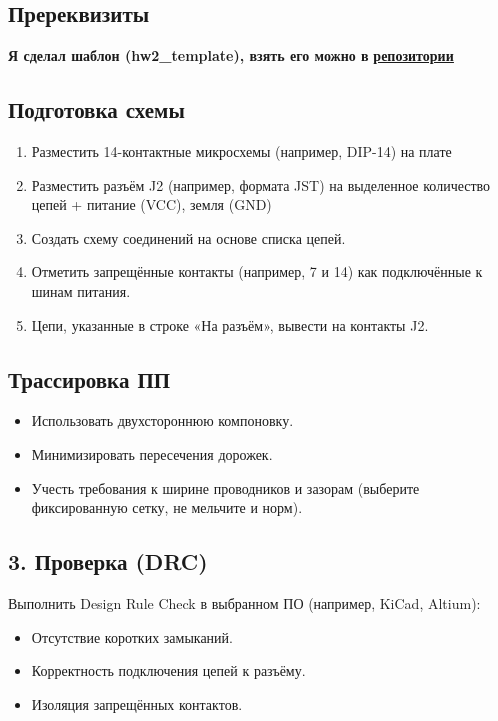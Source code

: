 \documentclass[a4paper, 12pt]{article}
\begin{document}
\subsection{Пререквизиты}
\textbf{Я сделал шаблон (hw2\_template), взять его можно в} \underline{\textbf{\href{https://github.com/Imtjl/ic-pcb-engineering/tree/master/hw2}{репозитории}}}

\subsection{Подготовка схемы}
\begin{enumerate}
	\item Разместить 14-контактные микросхемы (например, DIP-14) на плате
	\item Разместить разъём J2 (например, формата JST) на выделенное количество цепей + питание (VCC), земля (GND)
	\item Создать схему соединений на основе списка цепей.
	\item Отметить запрещённые контакты (например, 7 и 14) как подключённые к шинам питания.
	\item Цепи, указанные в строке «На разъём», вывести на контакты J2.
\end{enumerate}

\subsection{Трассировка ПП}
\begin{itemize}
	\item Использовать двухстороннюю компоновку.
	\item Минимизировать пересечения дорожек.
	\item Учесть требования к ширине проводников и зазорам (выберите фиксированную сетку, не мельчите и норм).
\end{itemize}

\subsection{3. Проверка (DRC)}
Выполнить Design Rule Check в выбранном ПО (например, KiCad, Altium):
\begin{itemize}
	\item Отсутствие коротких замыканий.
	\item Корректность подключения цепей к разъёму.
	\item Изоляция запрещённых контактов.
\end{itemize}
\end{document}
